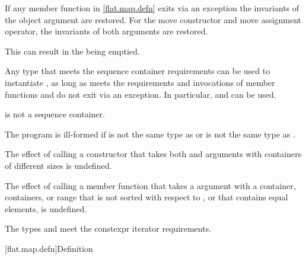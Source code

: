 \pnum
If any member function in \ref{flat.map.defn} exits via an exception
the invariants of the object argument are restored.
For the move constructor and move assignment operator,
the invariants of both arguments are restored.
\begin{note}
This can result in the  being emptied.
\end{note}

\pnum
Any type 
that meets the sequence container requirements
can be used to instantiate ,
as long as
 meets the  requirements and
invocations of
member functions  and  do not exit via an exception.
In particular,  and 
can be used.
\begin{note}
 is not a sequence container.
\end{note}

\pnum
The program is ill-formed if
 is not the same type as  or
 is not the same type as .

\pnum
The effect of calling a constructor
that takes
both  and  arguments with
containers of different sizes is undefined.

\pnum
The effect of calling a member function
that takes a  argument with
a container, containers, or range
that is not sorted with respect to , or
that contains equal elements,
is undefined.

\pnum
The types  and  meet
the constexpr iterator requirements.

[flat.map.defn]{Definition}

